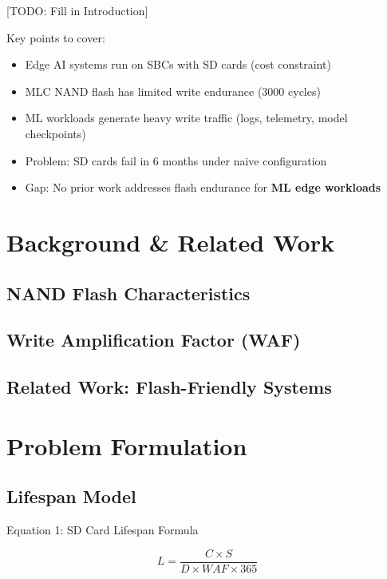 \documentclass[conference]{IEEEtran}
\begin{document}
[TODO: Fill in Introduction]

Key points to cover:
\begin{itemize}
    \item Edge AI systems run on SBCs with SD cards (cost constraint)
    \item MLC NAND flash has limited write  endurance (3000 cycles)
    \item ML workloads generate heavy write traffic (logs, telemetry, model checkpoints)
    \item Problem: SD cards fail in  6 months under naive configuration
    \item Gap: No prior work addresses flash endurance for \textbf{ML edge workloads}
\end{itemize}

\section{Background \& Related Work}

\subsection{NAND Flash Characteristics}
\subsection{Write Amplification Factor (WAF)}
\subsection{Related Work: Flash-Friendly Systems}

\section{Problem Formulation}

\subsection{Lifespan Model}

Equation 1: SD Card Lifespan Formula

\begin{equation}
L = \frac{C \times S}{D \times WAF \times 365}
\end{equation}
\end{document}
